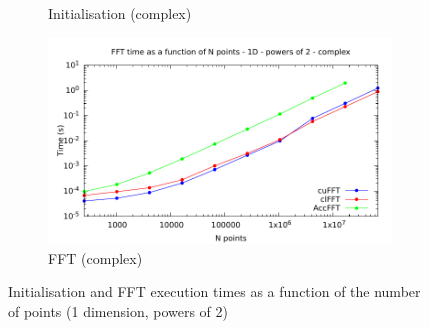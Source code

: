 \documentclass[12pt, a4paper]{article}
\begin{document}
\begin{figure}[htb]
\begin{subfigure}{.5\textwidth}
\caption{Initialisation (complex)}
\label{FFTPOW21DCI}
\end{subfigure}%
\begin{subfigure}{.5\textwidth}
\centering
\includegraphics[width=.9\linewidth]{graphs/fft-1d-pow2-c-exec.pdf}
\caption{FFT (complex)}
\label{FFTPOW21DCE}
\end{subfigure}
\caption{Initialisation and FFT execution times as a function of the number of points (1 dimension, powers of 2)}
\label{FFTPOW21D}
\end{figure}
\end{document}
